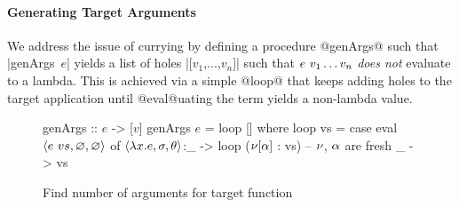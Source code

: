 \paragraph{Generating Target Arguments}
%
We address the issue of currying by defining a procedure @genArgs@ such that
\hbox{|genArgs $e$|} yields a list of holes |[$v_1$,...,$v_n$]|
such that $e\ v_1 \ldots v_n$ \emph{does not} evaluate to a lambda.
%
This is achieved via a simple @loop@ that keeps adding holes to the
target application until @eval@uating the term yields a
non-lambda value.
%
%

\begin{figure}[t]

\begin{mcode}
genArgs :: $e$ -> [$v$]
genArgs $e$ = loop []
  where
  loop vs = case eval $\langle e\ vs, \varnothing, \varnothing \rangle$ of
             $\langle \lambda x. e, \sigma, \theta \rangle$:_ -> loop ($\nu[\alpha]$ : vs)
                           -- $\nu$, $\alpha$ are fresh
             _          -> vs
\end{mcode}
\caption{Find number of arguments for target function}
\label{fig:algo-gen-args}
\end{figure}


